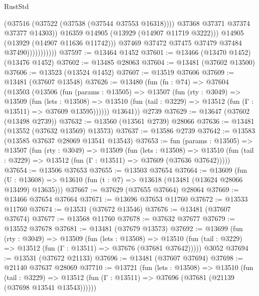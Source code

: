 \begin{lexlean}{RustStd}
\begin{coremodule}
                                  (@37516 (@37522 (@37538 (@37544 @37553 @16318))))
                                  @37368
                                  @37371
                                  @37374
                                  @37377
                                  @14303))
                              @16359
                              @14905
                              (@13929 (@14907 @11719 @3222)))
                            @14905
                            (@13929 (@14907 @11636 @11742)))
                          @37469
                          @37472
                          @37475
                          @37479
                          @37484
                          @37490)))))))))))
@37597 := @13464 @1452
@37601 := @13466 (@13470 @1452) (@13476 @1452)
@37602 := @13485 @28063
@37604 := @13481 (@37602 @13500)
@37606 := @13523 (@13524 @1452)
@37607 := @13519 @37606
@37609 := @13481 (@37607 @13548)
@37626 := @13480
    (fun (fn : @74) =>
    @37604
      (@13503
        (@13506
          (fun (params : @13505) =>
          @13507
            (fun (rty : @3049) =>
            @13509
              (fun (lets : @13508) =>
              @13510 (fun (tail : @3229) => @13512 (fun (Γ : @13511) => @37609 @13595))))))
        @13641))
    @2739
@37629 := @13647 (@37602 (@13498 @2739))
@37632 := @13560 (@13561 @2739) @28066
@37636 := @13481 (@13552 (@37632 @13569) @13573)
@37637 := @13586 @2739
@37642 := @13583 (@13585 @37637 @28069 @13541 @13543)
@37653 := fun (params : @13505) =>
  @13507
    (fun (rty : @3049) =>
    @13509
      (fun (lets : @13508) =>
      @13510 (fun (tail : @3229) => @13512 (fun (Γ : @13511) => @37609 (@37636 @37642)))))
@37654 := @13506 @37653
@37655 := @13503 @37654
@37664 := @13609
    (fun (U : @13608) => @13610 (fun (t : @7) => @13618 (@13481 (@13624 @28066 @13499) @13635)))
@37667 := @37629 (@37655 @37664) @28064
@37669 := @13466 @37654 @37664
@37671 := @13696 @37653 @11760
@37672 := @13533 @11760
@37674 := @13531 (@37672 @13546)
@37676 := @13481 (@37607 @37674)
@37677 := @13568 @11760
@37678 := @37632 @37677
@37679 := @13552 @37678
@37681 := @13481 (@37679 @13573)
@37692 := @13699
    (fun (rty : @3049) =>
    @13509
      (fun (lets : @13508) =>
      @13510 (fun (tail : @3229) => @13512 (fun (Γ : @13511) => @37676 (@37681 @37642)))))
    @3052
@37694 := @13531 (@37672 @21133)
@37696 := @13481 (@37607 @37694)
@37698 := @21140 @37637 @28069
@37710 := @13721
    (fun (lets : @13508) =>
    @13510
      (fun (tail : @3229) =>
      @13512 (fun (Γ : @13511) => @37696 (@37681 (@21139 (@37698 @13541 @13543))))))

\end{coremodule}
\end{lexlean}
